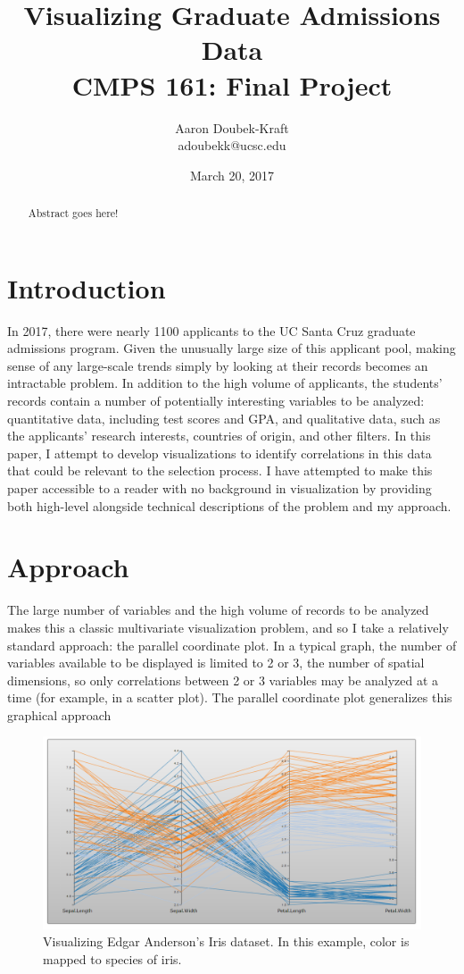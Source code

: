 \documentclass[]{article}
\title{Visualizing Graduate Admissions Data \\ CMPS 161: Final Project}
\author{Aaron Doubek-Kraft \\ adoubekk@ucsc.edu}
\date{March 20, 2017}
\begin{document}
	
\begin{titlepage}

	\maketitle

	\begin{abstract}
		Abstract goes here!
	\end{abstract}

\end{titlepage}

\section{Introduction}
	In 2017, there were nearly 1100 applicants to the UC Santa Cruz graduate admissions program. Given the unusually large size of this applicant pool, making sense of any large-scale trends simply by looking at their records becomes an intractable problem. In addition to the high volume of applicants, the students' records contain a number of potentially interesting variables to be analyzed: quantitative data, including test scores and GPA, and qualitative data, such as the applicants' research interests, countries of origin, and other filters.  In this paper, I attempt to develop visualizations to identify correlations in this data that could be relevant to the selection process. I have attempted to make this paper accessible to a reader with no background in visualization by providing both high-level alongside technical descriptions of the problem and my approach.

\section{Approach}
	The large number of variables and the high volume of records to be analyzed makes this a classic multivariate visualization problem, and so I take a relatively standard approach: the parallel coordinate plot. In a typical graph, the number of variables available to be displayed is limited to 2 or 3, the number of spatial dimensions, so only correlations between 2 or 3 variables may be analyzed at a time (for example, in a scatter plot). The parallel coordinate plot generalizes this graphical approach 

	\begin{figure}[h]
		\includegraphics[width=\linewidth]{iris.png}
		\caption{Visualizing Edgar Anderson's Iris dataset. In this example, color is mapped to species of iris.}
		\label{fig:Result}
	\end{figure}	
\end{document}
